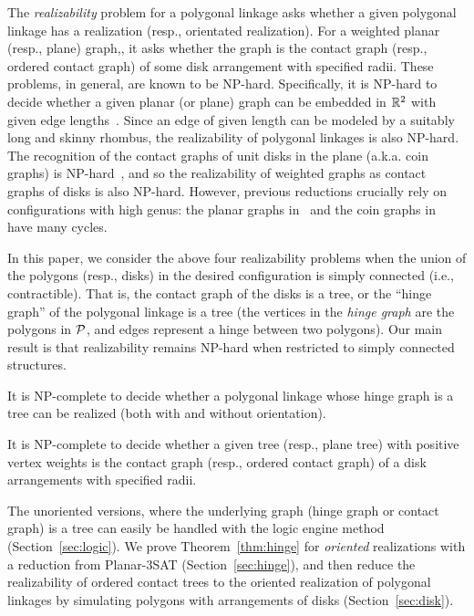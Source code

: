 The \emph{realizability} problem for a polygonal linkage asks whether a given polygonal linkage has a realization (resp., orientated realization). For a weighted planar (resp., plane) graph,, it asks whether the graph is
the contact graph (resp., ordered contact graph) of some disk arrangement with specified radii. These problems, in general, are known to be NP-hard. Specifically, it is NP-hard to decide whether a given planar (or plane) graph can be embedded in $\mathbb{R}^2$ with given edge lengths~\cite{CDD+10,EW90}. Since an edge of given length can be modeled by a suitably long and skinny rhombus, the realizability of polygonal linkages is also NP-hard. The recognition of the contact graphs of unit disks in the plane (a.k.a. coin graphs) is NP-hard~\cite{BK98}, and so the realizability of weighted graphs as contact graphs of disks is also NP-hard. However, previous reductions crucially rely on configurations with high genus: the planar graphs in~\cite{CDD+10,EW90} and the coin graphs in~\cite{BK98} have many cycles.

In this paper, we consider the above four realizability problems when the union of the polygons (resp., disks) in the desired configuration is simply connected (i.e., contractible). That is, the contact graph of the disks is a tree, or the ``hinge graph'' of the polygonal linkage is a tree (the vertices in the \emph{hinge graph} are the polygons in ${\cal P}$, and edges represent a hinge between two polygons). Our main result is that realizability remains NP-hard when restricted to simply connected structures.
 
\begin{thm}\label{thm:hinge}
It is NP-complete to decide whether a polygonal linkage whose hinge graph is a tree can be realized (both with and without orientation).
\end{thm}

\begin{thm}\label{thm:disk}
It is NP-complete to decide whether a given tree (resp., plane tree) with positive vertex weights
is the contact graph (resp., ordered contact graph) of a disk arrangements with specified radii.
\end{thm}

The unoriented versions, where the underlying graph (hinge graph or contact graph) is a tree can easily be handled with the logic engine method (Section~\ref{sec:logic}). We prove Theorem~\ref{thm:hinge} for \emph{oriented} realizations with a reduction from {\sc Planar-3SAT} (Section~\ref{sec:hinge}), and then reduce the realizability of ordered contact trees to the oriented realization of polygonal linkages by simulating polygons with arrangements of disks (Section~\ref{sec:disk}).

